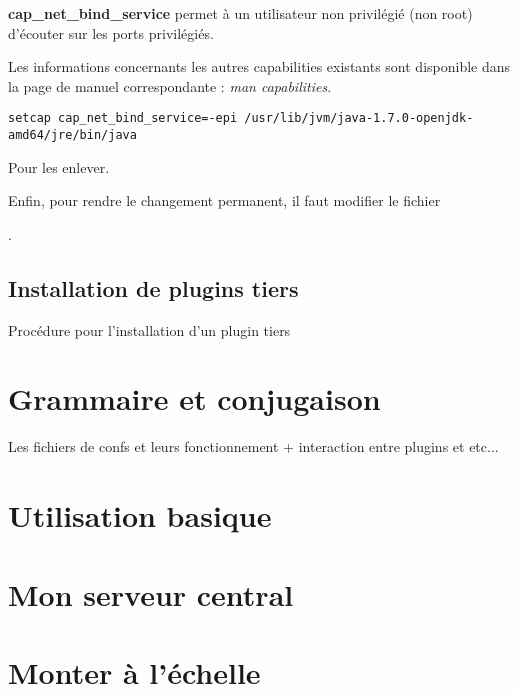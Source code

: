 \textbf{cap\_net\_bind\_service} permet à un utilisateur non privilégié (non root) 
d'écouter sur les ports privilégiés.

Les informations concernants les autres capabilities existants sont disponible dans
la page de manuel correspondante : \emph{man capabilities}.

\begin{lstlisting}[style=code,label={lst:unsetcapabilities}]
setcap cap_net_bind_service=-epi /usr/lib/jvm/java-1.7.0-openjdk-amd64/jre/bin/java
\end{lstlisting}
Pour les enlever.

Enfin, pour rendre le changement permanent, il faut modifier le fichier 

.

\subsection{Installation de plugins tiers}
Procédure pour l'installation d'un plugin tiers



\section{Grammaire et conjugaison}

Les fichiers de confs et leurs fonctionnement + interaction entre plugins et etc...



\section{Utilisation basique}

\section{Mon serveur central}



\section{Monter à l'échelle}




